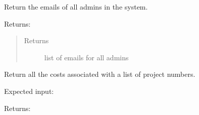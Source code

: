 \documentclass[letterpaper,10pt,english]{sphinxmanual}
\begin{document}
\begin{fulllineitems}
\begin{fulllineitems}
\begin{quote}
\begin{description}
\end{description}\end{quote}

\end{fulllineitems}


\begin{fulllineitems}
\label{\detokenize{apidoc/utdesign_procurement:utdesign_procurement.apigateway.ApiGateway.getAdminList}}
Return the emails of all admins in the system.

Returns:

\begin{sphinxVerbatim}[commandchars=\\\{\}]
\PYG{p}{[}
\PYG{p}{]}
\end{sphinxVerbatim}
\begin{quote}\begin{description}
\item[{Returns}] \leavevmode
list of emails for all admins

\end{description}\end{quote}

\end{fulllineitems}


\begin{fulllineitems}
\label{\detokenize{apidoc/utdesign_procurement:utdesign_procurement.apigateway.ApiGateway.getCosts}}
Return all the costs associated with a list of project numbers.

Expected input:

\begin{sphinxVerbatim}[commandchars=\\\{\}]
        
\end{sphinxVerbatim}

Returns:


\end{fulllineitems}
\end{fulllineitems}
\end{document}
